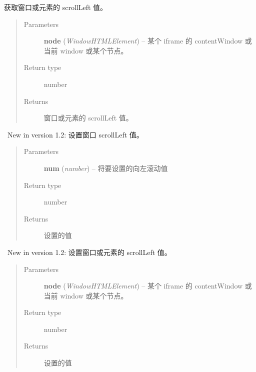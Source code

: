 \documentclass[letterpaper,10pt,english]{sphinxmanual}
\begin{document}
\begin{fulllineitems}
\label{api/core/dom/scrollLeft:DOM.scrollLeft}
获取窗口或元素的 scrollLeft 值。
\begin{quote}\begin{description}
\item[{Parameters}] \leavevmode
\textbf{node} (\emph{Window\textbar{}HTMLElement}) -- 某个 iframe 的 contentWindow 或当前 window 或某个节点。

\item[{Return type}] \leavevmode
number

\item[{Returns}] \leavevmode
窗口或元素的 scrollLeft 值。

\end{description}\end{quote}

\end{fulllineitems}



\begin{fulllineitems}
~New in version 1.2: 设置窗口 scrollLeft 值。\begin{quote}\begin{description}
\item[{Parameters}] \leavevmode
\textbf{num} (\emph{number}) -- 将要设置的向左滚动值

\item[{Return type}] \leavevmode
number

\item[{Returns}] \leavevmode
设置的值

\end{description}\end{quote}

\end{fulllineitems}



\begin{fulllineitems}
~New in version 1.2: 设置窗口或元素的 scrollLeft 值。\begin{quote}\begin{description}
\item[{Parameters}] \leavevmode
\textbf{node} (\emph{Window\textbar{}HTMLElement}) -- 某个 iframe 的 contentWindow 或当前 window 或某个节点。

\item[{Return type}] \leavevmode
number

\item[{Returns}] \leavevmode
设置的值

\end{description}\end{quote}

\end{fulllineitems}
\end{document}
